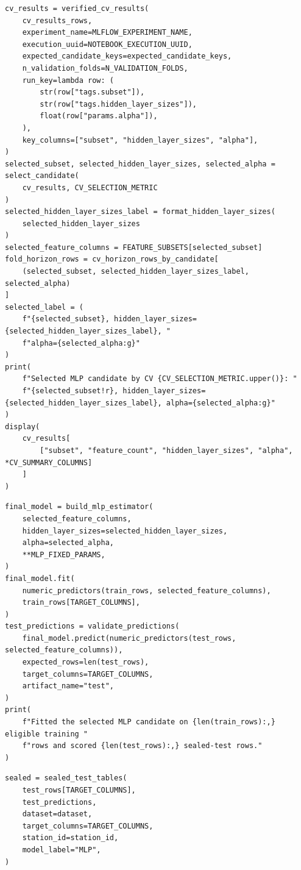 \begin{verbatim}
cv_results = verified_cv_results(
    cv_results_rows,
    experiment_name=MLFLOW_EXPERIMENT_NAME,
    execution_uuid=NOTEBOOK_EXECUTION_UUID,
    expected_candidate_keys=expected_candidate_keys,
    n_validation_folds=N_VALIDATION_FOLDS,
    run_key=lambda row: (
        str(row["tags.subset"]),
        str(row["tags.hidden_layer_sizes"]),
        float(row["params.alpha"]),
    ),
    key_columns=["subset", "hidden_layer_sizes", "alpha"],
)
selected_subset, selected_hidden_layer_sizes, selected_alpha = select_candidate(
    cv_results, CV_SELECTION_METRIC
)
selected_hidden_layer_sizes_label = format_hidden_layer_sizes(
    selected_hidden_layer_sizes
)
selected_feature_columns = FEATURE_SUBSETS[selected_subset]
fold_horizon_rows = cv_horizon_rows_by_candidate[
    (selected_subset, selected_hidden_layer_sizes_label, selected_alpha)
]
selected_label = (
    f"{selected_subset}, hidden_layer_sizes={selected_hidden_layer_sizes_label}, "
    f"alpha={selected_alpha:g}"
)
print(
    f"Selected MLP candidate by CV {CV_SELECTION_METRIC.upper()}: "
    f"{selected_subset!r}, hidden_layer_sizes={selected_hidden_layer_sizes_label}, alpha={selected_alpha:g}"
)
display(
    cv_results[
        ["subset", "feature_count", "hidden_layer_sizes", "alpha", *CV_SUMMARY_COLUMNS]
    ]
)
\end{verbatim}

\begin{verbatim}
final_model = build_mlp_estimator(
    selected_feature_columns,
    hidden_layer_sizes=selected_hidden_layer_sizes,
    alpha=selected_alpha,
    **MLP_FIXED_PARAMS,
)
final_model.fit(
    numeric_predictors(train_rows, selected_feature_columns),
    train_rows[TARGET_COLUMNS],
)
test_predictions = validate_predictions(
    final_model.predict(numeric_predictors(test_rows, selected_feature_columns)),
    expected_rows=len(test_rows),
    target_columns=TARGET_COLUMNS,
    artifact_name="test",
)
print(
    f"Fitted the selected MLP candidate on {len(train_rows):,} eligible training "
    f"rows and scored {len(test_rows):,} sealed-test rows."
)
\end{verbatim}

\begin{verbatim}
sealed = sealed_test_tables(
    test_rows[TARGET_COLUMNS],
    test_predictions,
    dataset=dataset,
    target_columns=TARGET_COLUMNS,
    station_id=station_id,
    model_label="MLP",
)
\end{verbatim}
